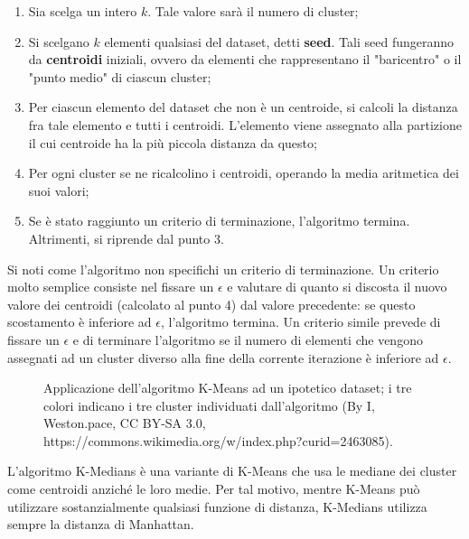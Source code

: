 \documentclass[a4paper, 12pt]{report}
\begin{document}
				\begin{enumerate}
					\item
						Sia scelga un intero $k$. Tale valore sarà il numero di cluster;
					\item
						Si scelgano $k$ elementi qualsiasi del dataset, detti \textbf{seed}.
						Tali seed fungeranno da \textbf{centroidi} iniziali, ovvero da elementi
						che rappresentano il "baricentro" o il "punto medio" di ciascun cluster;
					\item
						Per ciascun elemento del dataset che non è un centroide, si calcoli
						la distanza fra tale elemento e tutti i centroidi. L'elemento viene
						assegnato alla partizione il cui centroide ha la più piccola distanza
						da questo;
					\item
						Per ogni cluster se ne ricalcolino i centroidi, operando la media
						aritmetica dei suoi valori;
					\item
						Se è stato raggiunto un criterio di terminazione, l'algoritmo termina.
						Altrimenti, si riprende dal punto 3.
				\end{enumerate}

				Si noti come l'algoritmo non specifichi un criterio di terminazione. Un criterio
				molto semplice consiste nel fissare un $\epsilon$ e valutare di quanto
				si discosta il nuovo valore dei centroidi (calcolato al punto 4) dal
				valore precedente: se questo scostamento è inferiore ad $\epsilon$,
				l'algoritmo termina. Un criterio simile prevede di fissare un $\epsilon$
				e di terminare l'algoritmo se il numero di elementi che vengono assegnati
				ad un cluster diverso alla fine della corrente iterazione è inferiore ad
				$\epsilon$.

				\begin{figure}[H]
					\centering
					
					\caption{Applicazione dell'algoritmo K-Means ad un ipotetico dataset;
					i tre colori indicano i tre cluster individuati dall'algoritmo (By I,
					Weston.pace, CC BY-SA 3.0, https://commons.wikimedia.org/w/index.php?curid=2463085).}
					\label{fig:k-means-example}
				\end{figure}

				L'algoritmo K-Medians è una variante di K-Means che usa le mediane dei
				cluster come centroidi anziché le loro medie. Per tal motivo, mentre
				K-Means può utilizzare sostanzialmente qualsiasi funzione di distanza,
				K-Medians utilizza sempre la distanza di Manhattan.
\end{document}
